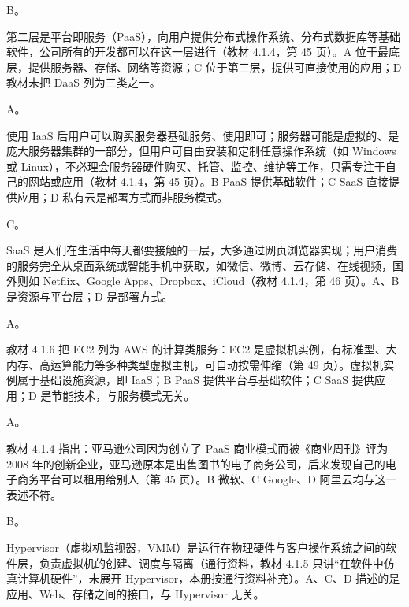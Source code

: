 \documentclass[a4paper,11pt]{article}
\begin{document}


\q B。\begin{analysis}第二层是平台即服务（PaaS），向用户提供分布式操作系统、分布式数据库等基础软件，公司所有的开发都可以在这一层进行（教材 4.1.4，第 45 页）。A 位于最底层，提供服务器、存储、网络等资源；C 位于第三层，提供可直接使用的应用；D 教材未把 DaaS 列为三类之一。\end{analysis}

\q A。\begin{analysis}使用 IaaS 后用户可以购买服务器基础服务、使用即可；服务器可能是虚拟的、是庞大服务器集群的一部分，但用户可自由安装和定制任意操作系统（如 Windows 或 Linux），不必理会服务器硬件购买、托管、监控、维护等工作，只需专注于自己的网站或应用（教材 4.1.4，第 45 页）。B PaaS 提供基础软件；C SaaS 直接提供应用；D 私有云是部署方式而非服务模式。\end{analysis}

\q C。\begin{analysis}SaaS 是人们在生活中每天都要接触的一层，大多通过网页浏览器实现；用户消费的服务完全从桌面系统或智能手机中获取，如微信、微博、云存储、在线视频，国外则如 Netflix、Google Apps、Dropbox、iCloud（教材 4.1.4，第 46 页）。A、B 是资源与平台层；D 是部署方式。\end{analysis}

\q A。\begin{analysis}教材 4.1.6 把 EC2 列为 AWS 的计算类服务：EC2 是虚拟机实例，有标准型、大内存、高运算能力等多种类型虚拟主机，可自动按需伸缩（第 49 页）。虚拟机实例属于基础设施资源，即 IaaS；B PaaS 提供平台与基础软件；C SaaS 提供应用；D 是节能技术，与服务模式无关。\end{analysis}

\q A。\begin{analysis}教材 4.1.4 指出：亚马逊公司因为创立了 PaaS 商业模式而被《商业周刊》评为 2008 年的创新企业，亚马逊原本是出售图书的电子商务公司，后来发现自己的电子商务平台可以租用给别人（第 45 页）。B 微软、C Google、D 阿里云均与这一表述不符。\end{analysis}

\q B。\begin{analysis}Hypervisor（虚拟机监视器，VMM）是运行在物理硬件与客户操作系统之间的软件层，负责虚拟机的创建、调度与隔离（通行资料，教材 4.1.5 只讲“在软件中仿真计算机硬件”，未展开 Hypervisor，本册按通行资料补充）。A、C、D 描述的是应用、Web、存储之间的接口，与 Hypervisor 无关。\end{analysis}
\end{document}
